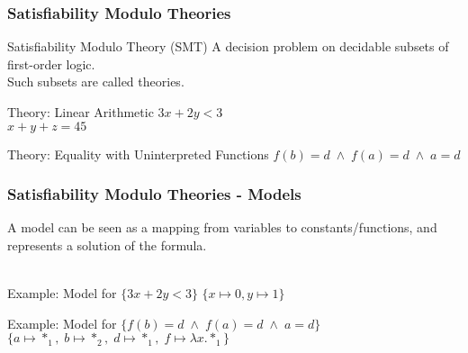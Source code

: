 \documentclass{beamer}
\makeatletter
\newcommand{\hl}{\textcolor{fibeamer@darkColor1}}
\makeatother
\begin{document}
\begin{frame}
    \frametitle{Satisfiability Modulo Theories}

    \begin{block}{Satisfiability Modulo Theory (SMT)}
		A decision problem on \hl{decidable subsets} of first-order logic.\\
		Such subsets are called \hl{theories}.
    \end{block}

		\begin{exampleblock}{Theory: Linear Arithmetic}
        $3x + 2y < 3$\\
        $x + y + z = 45$
    \end{exampleblock}

		\pause

		\begin{exampleblock}{Theory: Equality with Uninterpreted Functions}
        $f(b) = d \; \wedge \; f(a) = d \; \wedge \; a = d$
    \end{exampleblock}

\end{frame}

\begin{frame}
    \frametitle{Satisfiability Modulo Theories - Models}

    A model can be seen as a mapping from variables to constants/functions, and represents
		a solution of the formula.\\~\\

		\begin{exampleblock}{Example: Model for $\{3x + 2y < 3\}$}
				$\{ x \mapsto 0, y \mapsto 1\}$
		\end{exampleblock}

		\pause

		\begin{exampleblock}{Example: Model for $\{f(b) = d \; \wedge \; f(a) = d \; \wedge \; a = d\}$}
				$\{ a \mapsto *_1,\; b \mapsto *_2,\; d \mapsto *_1,\; f \mapsto \lambda x. *_1\}$
		\end{exampleblock}
\end{frame}
\end{document}
